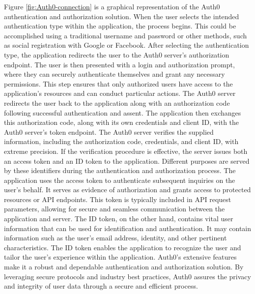 \documentclass[../Main.tex]{subfiles}
\begin{document}
Figure \ref{fig:Auth0-connection} is a graphical representation of the Auth0 authentication and authorization solution. When the user selects the intended authentication type within the application, the process begins. This could be accomplished using a traditional username and password or other methods, such as social registration with Google or Facebook. After selecting the authentication type, the application redirects the user to the Auth0 server's authorization endpoint. The user is then presented with a login and authorization prompt, where they can securely authenticate themselves and grant any necessary permissions. This step ensures that only authorized users have access to the application's resources and can conduct particular actions. The Auth0 server redirects the user back to the application along with an authorization code following successful authentication and assent. The application then exchanges this authorization code, along with its own credentials and client ID, with the Auth0 server's token endpoint. The Auth0 server verifies the supplied information, including the authorization code, credentials, and client ID, with extreme precision. If the verification procedure is effective, the server issues both an access token and an ID token to the application. Different purposes are served by these identifiers during the authentication and authorization process. The application uses the access token to authenticate subsequent inquiries on the user's behalf. It serves as evidence of authorization and grants access to protected resources or API endpoints. This token is typically included in API request parameters, allowing for secure and seamless communication between the application and server. The ID token, on the other hand, contains vital user information that can be used for identification and authentication. It may contain information such as the user's email address, identity, and other pertinent characteristics. The ID token enables the application to recognize the user and tailor the user's experience within the application. Auth0's extensive features make it a robust and dependable authentication and authorization solution. By leveraging secure protocols and industry best practices, Auth0 assures the privacy and integrity of user data through a secure and efficient process.
\end{document}
